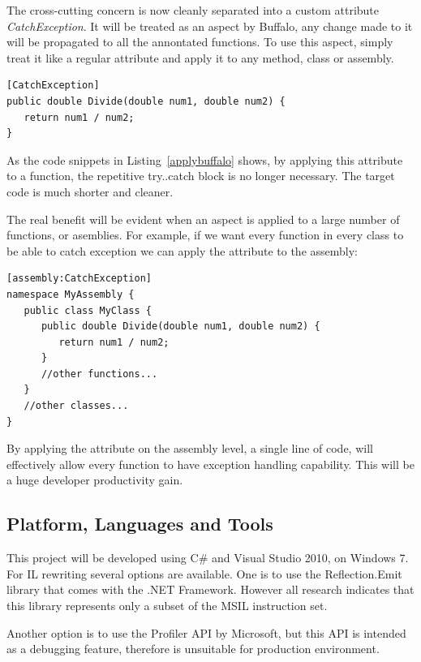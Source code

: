 The cross-cutting concern is now cleanly separated into a custom attribute {\em CatchException}. It will be treated as an aspect by Buffalo, any change made to it will be propagated to all the annontated functions. To use this aspect, simply treat it like a regular attribute and apply it to any method, class or assembly.

\begin{lstlisting}[caption={applying Buffalo aspect}, label=applybuffalo]
[CatchException]
public double Divide(double num1, double num2) {
   return num1 / num2;
}
\end{lstlisting}

As the code snippets in Listing~\ref{applybuffalo} shows, by applying this attribute to a function, the repetitive try..catch block is no longer necessary. The target code is much shorter and cleaner. 

The real benefit will be evident when an aspect is applied to a large number of functions, or asemblies. For example, if we want every function in every class to be able to catch exception we can apply the attribute to the assembly:

\begin{lstlisting}[caption={applying Buffalo aspect on an assembly}, label=applybuffaloassembly]
[assembly:CatchException]
namespace MyAssembly {
   public class MyClass {
      public double Divide(double num1, double num2) {
         return num1 / num2;
      }
      //other functions...
   }
   //other classes...
}
\end{lstlisting}

By applying the attribute on the assembly level, a single line of code, will effectively allow every function to have exception handling capability. This will be a huge developer productivity gain.

\subsection{Platform, Languages and Tools}
This project will be developed using C\# and Visual Studio 2010, on Windows 7. For IL rewriting several options are available. One is to use the Reflection.Emit library that comes with the .NET Framework. However all research indicates that this library represents only a subset of the MSIL instruction set.

Another option is to use the Profiler API by Microsoft, but this API is intended as a debugging feature, therefore is unsuitable for production environment.

